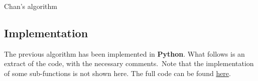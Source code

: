 \documentclass[
12pt,
a4paper,
oneside,
headinclude,
footinclude]{report}
\theoremstyle{definition} %
\begin{document}
\begin{algorithm}[H]
	\DontPrintSemicolon
	\SetAlgoVlined
	\caption{Chan's algorithm}
\end{algorithm}

\subsection{Implementation}
The previous algorithm has been implemented in \textbf{Python}. What follows is an extract of the code, with the necessary comments.\
Note that the implementation of some sub-functions is not shown here. The full code can be found \href{https://github.com/AlbertoParravicini/data_structures_and_algorithms/tree/master/Project}{here}.
\newpage
\end{document}
